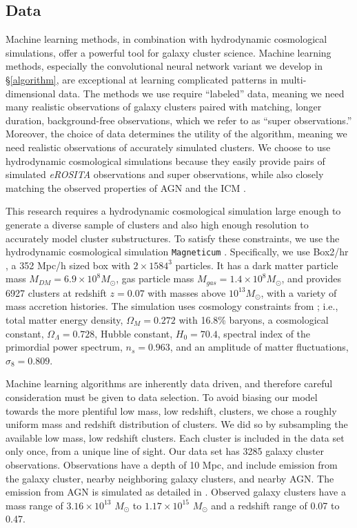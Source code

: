 \documentclass[twocolumn, 11pt]{aastex63}%
\begin{document}
\subsection{Data}\label{data}
Machine learning methods, in combination with hydrodynamic cosmological simulations, offer a powerful tool for galaxy cluster science. Machine learning methods, especially the convolutional neural network variant we develop in \S\ref{algorithm}, are exceptional at learning complicated patterns in multi-dimensional data. The methods we use require ``labeled'' data, meaning we need many realistic observations of galaxy clusters paired with matching, longer duration, background-free observations, which we refer to as ``super observations.'' Moreover, the choice of data determines the utility of the algorithm, meaning we need realistic observations of accurately simulated clusters. We choose to use hydrodynamic cosmological simulations because they easily provide pairs of simulated \textit{eROSITA} observations and super observations, while also closely matching the observed properties of AGN and the ICM \citep[see e.g.,][]{Hirschmann_2014, Rasia_2015, magneticum}. 

This research requires a hydrodynamic cosmological simulation large enough to generate a diverse sample of clusters and also high enough resolution to accurately model cluster substructures. To satisfy these constraints, we use the hydrodynamic cosmological simulation \texttt{Magneticum} \citep{magneticum}. Specifically, we use Box2/hr \citep{Hirschmann_2014}, a 352 Mpc/h sized  box with $2 \times 1584^3$ particles. It has a dark matter particle mass $M_{DM} = 6.9\times10^{8} M_{\odot}$, gas particle mass $M_{gas}=1.4\times10^{8}M_{\odot}$, and provides 6927 clusters at redshift $z=0.07$ with masses above $10^{13}M_{\odot}$, with a variety of mass accretion histories. The simulation uses cosmology constraints from \citet{Komatsu_2011}; i.e., total matter energy density, $\Omega_M = 0.272$ with 16.8\% baryons, a cosmological constant, $\Omega_{\Lambda} = 0.728$, Hubble constant, $H_0 = 70.4$, spectral index of the primordial power spectrum, $n_{s} = 0.963$, and an amplitude of matter fluctuations, $\sigma_8 = 0.809$.

Machine learning algorithms are inherently data driven, and therefore careful consideration must be given to data selection. To avoid biasing our model towards the more plentiful low mass, low redshift, clusters, we chose a roughly uniform mass and redshift distribution of clusters. We did so by subsampling the available low mass, low redshift clusters. Each cluster is included in the data set only once, from a unique line of sight. Our data set has 3285 galaxy cluster observations. Observations have a depth of 10 Mpc, and include emission from the galaxy cluster, nearby neighboring galaxy clusters, and nearby AGN. The emission from AGN is simulated as detailed in \citet{Biffi_2018}. Observed galaxy clusters have a mass range of $3.16 \times 10^{13}$ $M_{\odot}$ to $1.17 \times 10^{15}$ $M_{\odot}$ and a redshift range of 0.07 to 0.47.
\end{document}
